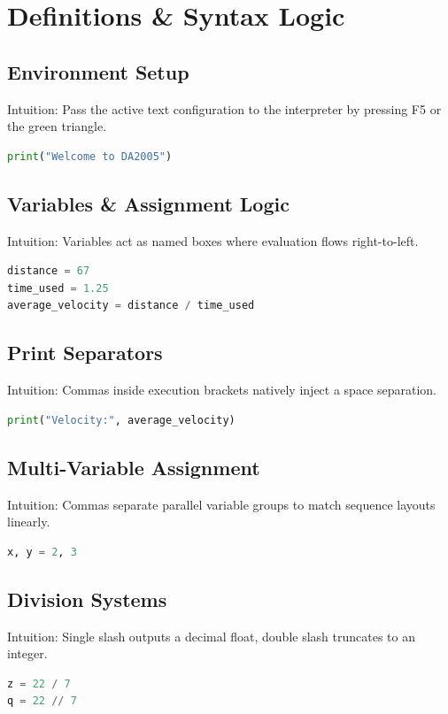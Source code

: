 \documentclass{article}
\begin{document}
\section{Definitions \& Syntax Logic}

\subsection{Environment Setup}
Intuition: Pass the active text configuration to the interpreter by pressing F5 or the green triangle.
\begin{lstlisting}[language=Python]
print("Welcome to DA2005")
\end{lstlisting}

\subsection{Variables \& Assignment Logic}
Intuition: Variables act as named boxes where evaluation flows right-to-left.
\begin{lstlisting}[language=Python]
distance = 67
time_used = 1.25
average_velocity = distance / time_used
\end{lstlisting}

\subsection{Print Separators}
Intuition: Commas inside execution brackets natively inject a space separation.
\begin{lstlisting}[language=Python]
print("Velocity:", average_velocity)
\end{lstlisting}

\subsection{Multi-Variable Assignment}
Intuition: Commas separate parallel variable groups to match sequence layouts linearly.
\begin{lstlisting}[language=Python]
x, y = 2, 3
\end{lstlisting}

\subsection{Division Systems}
Intuition: Single slash outputs a decimal float, double slash truncates to an integer.
\begin{lstlisting}[language=Python]
z = 22 / 7
q = 22 // 7
\end{lstlisting}
\end{document}
